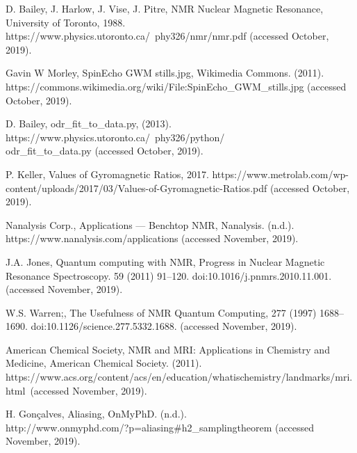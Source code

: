 \documentclass[a4paper, 12pt]{article}  %
\begin{document}
\begin{thebibliography}{9}

D. Bailey, J. Harlow, J. Vise, J. Pitre, NMR Nuclear Magnetic Resonance, University of Toronto, 1988. https://www.physics.utoronto.ca/~phy326/nmr/nmr.pdf (accessed October, 2019).

Gavin W Morley, SpinEcho GWM stills.jpg,     Wikimedia Commons. (2011). https://commons.wikimedia.org/wiki/File:SpinEcho\_GWM\_stills.jpg (accessed October, 2019).

D. Bailey, odr\_fit\_to\_data.py, (2013). https://www.physics.utoronto.ca/~phy326/python/\\odr\_fit\_to\_data.py (accessed October, 2019).

P. Keller, Values of Gyromagnetic Ratios, 2017. https://www.metrolab.com/wp-content/uploads/2017/03/Values-of-Gyromagnetic-Ratios.pdf (accessed October, 2019).

Nanalysis Corp., Applications — Benchtop NMR, Nanalysis. (n.d.). https://www.nanalysis.com/applications (accessed November, 2019).

J.A. Jones, Quantum computing with NMR, Progress in Nuclear Magnetic Resonance Spectroscopy. 59 (2011) 91–120. doi:10.1016/j.pnmrs.2010.11.001.(accessed November, 2019).

W.S. Warren;, The Usefulness of NMR Quantum Computing, 277 (1997) 1688–1690. doi:10.1126/science.277.5332.1688. (accessed November, 2019).

American Chemical Society, NMR and MRI: Applications in Chemistry and Medicine, American Chemical Society. (2011). https://www.acs.org/content/acs/en/education/whatischemistry/landmarks/mri.html\ (accessed November, 2019).

H. Gonçalves, Aliasing, OnMyPhD. (n.d.). \\ http://www.onmyphd.com/?p=aliasing\#h2\_samplingtheorem (accessed November, 2019).

\end{thebibliography}

\end{document}
